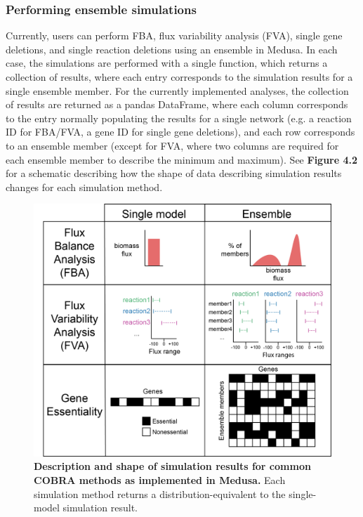 \documentclass[11pt,twocolumn,notitlepage,openany,twoside]{book}
\begin{document}
\begin{refsection}
\subsubsection{Performing ensemble simulations}


Currently, users can perform FBA, flux variability analysis (FVA), single gene deletions, and single reaction deletions using an ensemble in Medusa. In each case, the simulations are performed with a single function, which returns a collection of results, where each entry corresponds to the simulation results for a single ensemble member. For the currently implemented analyses, the collection of results are returned as a pandas DataFrame, where each column corresponds to the entry normally populating the results for a single network (e.g. a reaction ID for FBA/FVA, a gene ID for single gene deletions), and each row corresponds to an ensemble member (except for FVA, where two columns are required for each ensemble member to describe the minimum and maximum). See \textbf{Figure 4.2} for a schematic describing how the shape of data describing simulation results changes for each simulation method.

\begin{figure}[tb]
\centering
\includegraphics[width=0.9\linewidth]{ch4_fig2}
\caption[ Description and shape of simulation results for common COBRA methods as implemented in Medusa.]{\textbf{ Description and shape of simulation results for common COBRA methods as implemented in Medusa.} Each simulation method returns a distribution-equivalent to the single-model simulation result.}
\end{figure}


\end{refsection}
\end{document}
